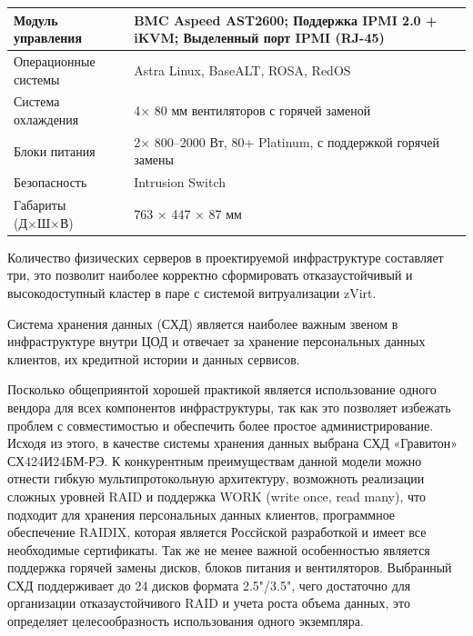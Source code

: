 \documentclass[14pt, a4paper]{extarticle}
\begin{document}
\begin{tabularx}{\textwidth}{|l|X|}
  Модуль управления                    & BMC Aspeed AST2600; Поддержка IPMI 2.0 + iKVM; Выделенный порт IPMI (RJ-45)                                                                                       \\\hline
  Операционные системы                 & Astra Linux, BaseALT, ROSA, RedOS                                                                                                                                 \\\hline
  Система охлаждения                   & 4× 80 мм вентиляторов с горячей заменой                                                                                                                           \\
  Блоки питания                        & 2× 800–2000 Вт, 80+ Platinum, с поддержкой горячей замены                                                                                                         \\\hline
  Безопасность                         & Intrusion Switch                                                                                                                                                  \\\hline
  Габариты (Д×Ш×В)                     & 763 × 447 × 87 мм                                                                                                                                                 \\\hline
\end{tabularx}

Количество физических серверов в проектируемой инфраструктуре составляет три, это позволит
наиболее корректно сформировать отказаустойчивый и высокодоступный кластер в паре с
системой витруализации zVirt.

Система хранения данных (СХД) является наиболее важным звеном в инфраструктуре внутри ЦОД
и отвечает за хранение персональных данных клиентов, их кредитной истории и данных сервисов.

Посколько общеприянтой хорошей практикой является использование одного вендора для всех
компонентов инфраструктуры, так как это позволяет избежать проблем с совместимостью и
обеспечить более простое администрирование. Исходя из этого, в качестве системы хранения
данных выбрана СХД «Гравитон» СХ424И24БМ-РЭ. К конкурентным преимуществам данной модели
можно отнести гибкую мультипротокольную архитектуру, возможноть реализации сложных
уровней RAID и поддержка WORK (write once, read many), что подходит для хранения
персональных данных клиентов, программное обеспечение RAIDIX, которая является
Россйской разработкой и имеет все необходимые сертификаты. Так же не менее важной
особенностью является поддержка горячей замены дисков, блоков питания и вентиляторов.
Выбранный СХД поддерживает до 24 дисков формата 2.5"/3.5", чего достаточно для организации
отказаустойчивого RAID и учета роста объема данных, это определяет целесообразность
использования одного экземпляра.
\end{document}
